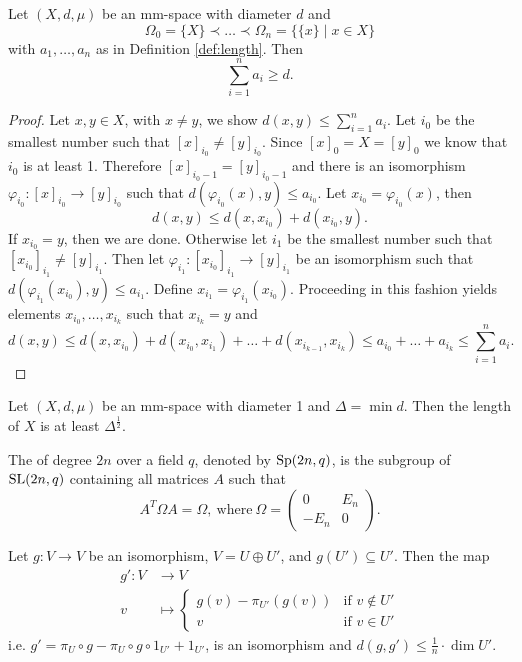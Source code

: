 \begin{lemma}
Let $(X,d,\mu)$ be an mm-space with diameter $d$ and 
\[\Omega_0=\{X\}\prec\dots\prec\Omega_n=\{\{x\}\mid x\in X\}\]
with $a_1,\dots,a_n$ as in Definition \ref{def:length}. Then 
\[\sum_{i=1}^{n}a_i\geq d.\]
\end{lemma}
\begin{proof}
Let $x,y\in X$, with $x\neq y$, we show $d(x,y)\leq\sum_{i=1}^{n}a_i$. Let $i_0$ be the smallest number such that $[x]_{i_0}\neq [y]_{i_0}$. Since $[x]_0=X=[y]_0$ we know that $i_0$ is at least 1. Therefore $[x]_{i_0-1}=[y]_{i_0-1}$ and there is an isomorphism $\varphi_{i_0}\colon[x]_{i_0}\to[y]_{i_0}$ such that $d(\varphi_{i_0}(x),y)\leq a_{i_0}$. Let $x_{i_0}=\varphi_{i_0}(x)$, then 
\[d(x,y)\leq d(x,x_{i_0})+d(x_{i_0},y).\]
If $x_{i_0}=y$, then we are done. Otherwise let $i_1$ be the smallest number such that $[x_{i_0}]_{i_1}\neq [y]_{i_1}$. Then let $\varphi_{i_1}\colon[x_{i_0}]_{i_1}\to[y]_{i_1}$ be an isomorphism such that $d(\varphi_{i_1}(x_{i_0}),y)\leq a_{i_1}$. Define $x_{i_1}=\varphi_{i_1}(x_{i_0})$. Proceeding in this fashion yields elements $x_{i_0},\dots,x_{i_k}$ such that $x_{i_k}=y$ and
\[d(x,y)\leq d(x,x_{i_0})+d(x_{i_0},x_{i_1})+\dots+d(x_{i_{k-1}},x_{i_k})\leq a_{i_0}+\dots +a_{i_k}\leq\sum_{i=1}^{n}a_i.\] 
\end{proof}

\begin{lemma}
Let $(X,d,\mu)$ be an mm-space with diameter 1 and $\Delta=\min d$. Then the length of $X$ is at least $\Delta^{\frac{1}{2}}$.
\end{lemma}

\begin{definition}
The  of degree $2n$ over a field $q$, denoted by $\operatorname{Sp}(2n,q)$, is the subgroup of $\operatorname{SL}(2n,q)$ containing all matrices $A$ such that
\[A^T\Omega A=\Omega,\ \text{where}\ \Omega=\left(\begin{array}{cc}
0&E_n\\
-E_n&0
\end{array}\right).\]
\end{definition}

\begin{lemma}
Let $g\colon V\to V$ be an isomorphism, $V=U\oplus U'$, and $g(U')\subseteq U'$. %
Then the map 
\begin{align*}
g'\colon V&\to V\\
v&\mapsto
\begin{cases}
g(v)-\pi_{U'}(g(v)) &\text{if }v\notin U'\\
v &\text{if }v\in U'
\end{cases}
\end{align*}
i.e. $g'=\pi_U\circ g-\pi_U\circ g \circ1_{U'} +1_{U'}$, is an isomorphism and $d(g,g')\leq \frac{1}{n}\cdot\dim U'$.
\end{lemma}


